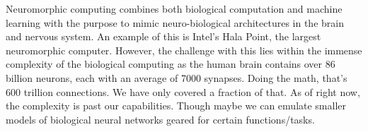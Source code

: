 \documentclass[letterpaper,11pt]{article}
\begin{document}
\begin{enumerate}
\begin{tcolorbox}
Neuromorphic computing combines both biological computation and machine learning with the purpose to mimic neuro-biological architectures in the brain and nervous system. An example of this is Intel's Hala Point, the largest neuromorphic computer. However, the challenge with this lies within the immense complexity of the biological computing as the human brain contains over 86 billion neurons, each with an average of 7000 synapses. Doing the math, that's 600 trillion connections. We have only covered a fraction of that. As of right now, the complexity is past our capabilities. Though maybe we can emulate smaller models of biological neural networks geared for certain functions/tasks.
\end{tcolorbox}
    
\end{enumerate}
\end{document}
